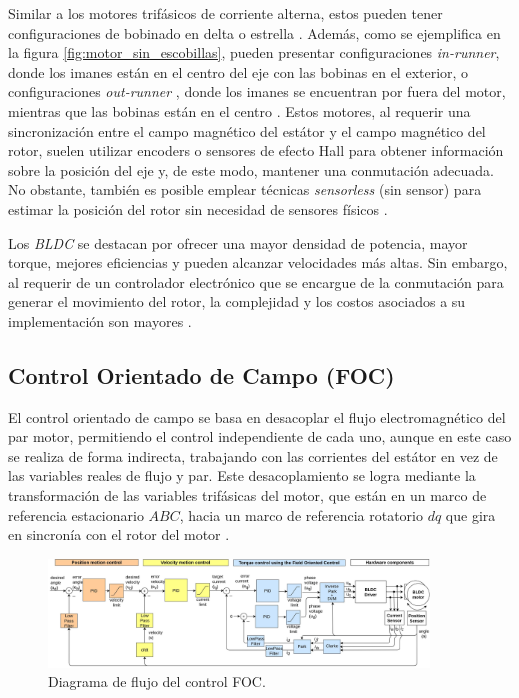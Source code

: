 \documentclass[11pt]{report}
\begin{document}
Similar a los motores trifásicos de corriente alterna, estos pueden tener configuraciones de bobinado en delta o estrella \cite{Millet2022}. Además, como se ejemplifica en la figura \ref{fig:motor_sin_escobillas}, pueden presentar configuraciones \textit{in-runner}, donde los imanes están en el centro del eje con las bobinas en el exterior, o configuraciones \textit{out-runner} , donde los imanes se encuentran por fuera del motor, mientras que las bobinas están en el centro \cite{9774372}. Estos motores, al requerir una sincronización entre el campo magnético del estátor y el campo magnético del rotor, suelen utilizar encoders o sensores de efecto Hall para obtener información sobre la posición del eje y, de este modo, mantener una conmutación adecuada. No obstante, también es posible emplear técnicas \textit{sensorless} (sin sensor) para estimar la posición del rotor sin necesidad de sensores físicos \cite{Gualtieri2018_STEP}.

Los \textit{BLDC} se destacan por ofrecer una mayor densidad de potencia, mayor torque, mejores eficiencias y pueden alcanzar velocidades más altas. Sin embargo, al requerir de un controlador electrónico que se encargue de la conmutación para generar el movimiento del rotor, la complejidad y los costos asociados a su implementación son mayores \cite{AN885}.

\newpage
\subsection{Control Orientado de Campo (FOC)}
El control orientado de campo se basa en desacoplar el flujo electromagnético del par motor, permitiendo el control independiente de cada uno, aunque en este caso se realiza de forma indirecta, trabajando con las corrientes del estátor en vez de las variables reales de flujo y par. Este desacoplamiento se logra mediante la transformación de las variables trifásicas del motor, que están en un marco de referencia estacionario \(ABC\), hacia un marco de referencia rotatorio \(dq\) que gira en sincronía con el rotor del motor \cite{power_conv_14}.

\begin{figure}[ht]
	\centering
	\includegraphics[width=0.9\textwidth]{imagenes/Diagramas/simpleFOC.jpg}
	\caption{Diagrama de flujo del control FOC\cite{Skuric_SimpleFOC_A_Field_2022}.}
	\label{fig:foc_transform}
\end{figure}
\FloatBarrier
\end{document}
